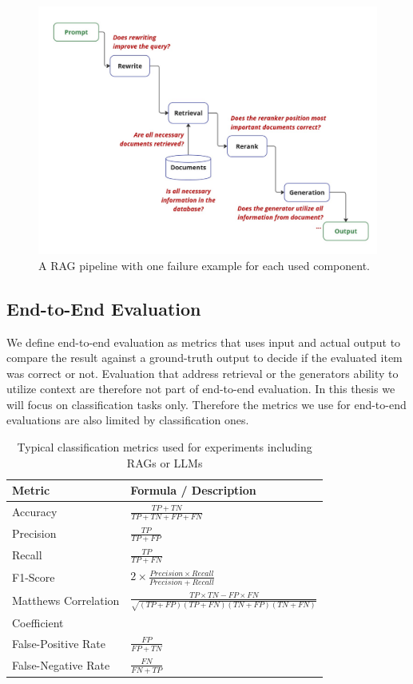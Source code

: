 \begin{figure}
  \centering
  \includegraphics[width=\textwidth]{images/FailurePointExamples.pdf}
  \caption{A RAG pipeline with one failure example for each used component.}
  \label{fig:failures}
\end{figure}

\subsection{End-to-End Evaluation}

We define end-to-end evaluation as metrics that uses input and actual output to compare the result against a ground-truth output to decide if the evaluated item was correct or not. Evaluation that address retrieval or the generators ability to utilize context are therefore not part of end-to-end evaluation. In this thesis we will focus on classification tasks only. Therefore the metrics we use for end-to-end evaluations are also limited by classification ones. 

{\renewcommand{\arraystretch}{1.5}%
\begin{table}
  \centering
 \begin{tabular}{|l|l|}
  \hline
  \textbf{Metric} & \textbf{Formula / Description} \\[3pt]
  \hline Accuracy & $\frac{TP + TN}{TP + TN + FP + FN}$\\[5pt]
  \hline Precision & $\frac{TP}{TP + FP}$\\[5pt]
  \hline Recall & $\frac{TP}{TP + FN}$\\[2pt]
  \hline F1-Score & $2 \times \frac{Precision \times Recall}{Precision + Recall}$\\[2pt]
  \hline Matthews Correlation & $\frac{TP \times TN - FP \times FN}{\sqrt{(TP + FP)(TP + FN)(TN + FP)(TN + FN)}}$\\Coefficient & \\[2pt]
  \hline False-Positive Rate & $\frac{FP}{FP + TN}$\\[2pt]
  \hline False-Negative Rate & $\frac{FN}{FN + TP}$\\[2pt]
  \hline
 \end{tabular}
 \caption{Typical classification metrics used for experiments including RAGs or LLMs\cite{Hou.8212023,Zeng.28.03.2024}}
 \label{table:classification_metrics}
\end{table}}

